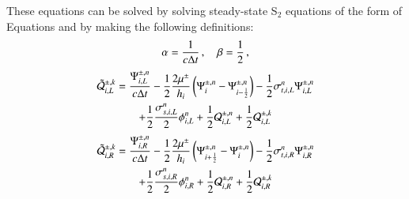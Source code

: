 \documentclass[preprint,12pt]{elsarticle}
\begin{document}
These equations can be solved by solving steady-state S$_2$ equations
of the form of Equations  and  by making
the following definitions:
\begin{equation}
  \alpha = \frac{1}{c\Delta t} \, , \quad \beta = \frac{1}{2}\, ,
\end{equation}
\begin{multline}
  \tilde{\mathcal{Q}}_{i,L}^{\pm,k}
  = \frac{\Psi_{i,L}^{\pm,n}}{c\Delta t}
  - \frac{1}{2}\frac{2\mu^\pm}{h_i}\left( \Psi_i^{\pm,n} - \Psi_{i-\frac{1}{2}}^{\pm,n} \right)
  - \frac{1}{2}\sigma_{t,i,L}^n\Psi_{i,L}^{\pm,n}\\
  + \frac{1}{2}\frac{\sigma_{s,i,L}^n}{2}\phi_{i,L}^n
  + \frac{1}{2}\mathcal{Q}_{i,L}^{\pm,n}
  + \frac{1}{2}\mathcal{Q}_{i,L}^{\pm,k}
\end{multline}
\begin{multline}
  \tilde{\mathcal{Q}}_{i,R}^{\pm,k}
  = \frac{\Psi_{i,R}^{\pm,n}}{c\Delta t}
  - \frac{1}{2}\frac{2\mu^\pm}{h_i}\left( \Psi_{i+\frac{1}{2}}^{\pm,n} - \Psi_i^{\pm,n} \right)
  - \frac{1}{2}\sigma_{t,i,R}^n\Psi_{i,R}^{\pm,n}\\
  + \frac{1}{2}\frac{\sigma_{s,i,R}^n}{2}\phi_{i,R}^n
  + \frac{1}{2}\mathcal{Q}_{i,R}^{\pm,n}
  + \frac{1}{2}\mathcal{Q}_{i,R}^{\pm,k}
\end{multline}
\end{document}
